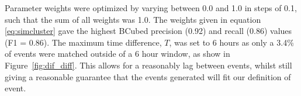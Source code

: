 Parameter weights were optimized by varying between 0.0 and 1.0 in steps of 0.1, such that the sum of all weights was 1.0.
The weights given in equation \ref{eq:simcluster} gave the highest BCubed precision (0.92) and recall (0.86) values (F1 = 0.86).
The maximum time difference, $T$, was set to 6 hours  as only a 3.4\% of events were matched outside of a 6 hour window, as show in Figure~\ref{fig:dif_diff}.
This allows for a reasonably lag between events, whilst still giving a reasonable guarantee that the events generated will fit our definition of event.
